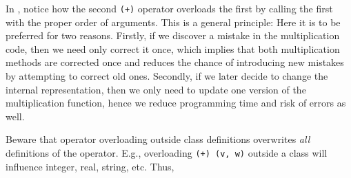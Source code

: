 \documentclass[fsharpNotes.tex]{subfiles}
\begin{document}
In , notice how the second \lstinline{(+)} operator overloads the first by calling the first with the proper order of arguments. This is a general principle:  Here it is to be preferred for two reasons. Firstly, if we discover a mistake in the multiplication code, then we need only correct it once, which implies that both multiplication methods are corrected once and reduces the chance of introducing new mistakes by attempting to correct old ones. Secondly, if we later decide to change the internal representation, then we only need to update one version of the multiplication function, hence we reduce programming time and risk of errors as well.

Beware that operator overloading outside class definitions overwrites \emph{all} definitions of the operator. E.g., overloading \lstinline{(+) (v, w)} outside a class will influence integer, real, string, etc. Thus, 

\end{document}
